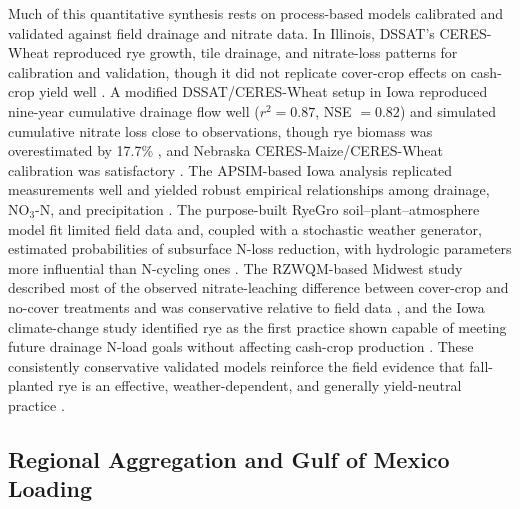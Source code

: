 \documentclass[11pt]{article}
\begin{document}
Much of this quantitative synthesis rests on process-based models calibrated and validated against field drainage and nitrate data. In Illinois, DSSAT's CERES-Wheat reproduced rye growth, tile drainage, and nitrate-loss patterns for calibration and validation, though it did not replicate cover-crop effects on cash-crop yield well \parencite{Gupta2022}. A modified DSSAT/CERES-Wheat setup in Iowa reproduced nine-year cumulative drainage flow well ($r^2=0.87$, NSE $=0.82$) and simulated cumulative nitrate loss close to observations, though rye biomass was overestimated by 17.7\% \parencite{Chatterjee2025}, and Nebraska CERES-Maize/CERES-Wheat calibration was satisfactory \parencite{Birru2023}. The APSIM-based Iowa analysis replicated measurements well and yielded robust empirical relationships among drainage, NO$_3$-N, and precipitation \parencite{MartinezFeria2016}. The purpose-built RyeGro soil--plant--atmosphere model fit limited field data and, coupled with a stochastic weather generator, estimated probabilities of subsurface N-loss reduction, with hydrologic parameters more influential than N-cycling ones \parencite{Feyereisen2006b}. The RZWQM-based Midwest study described most of the observed nitrate-leaching difference between cover-crop and no-cover treatments and was conservative relative to field data \parencite{Malone2014b}, and the Iowa climate-change study identified rye as the first practice shown capable of meeting future drainage N-load goals without affecting cash-crop production \parencite{Malone2020}. These consistently conservative validated models reinforce the field evidence that fall-planted rye is an effective, weather-dependent, and generally yield-neutral practice \parencite{Malone2014b,Malone2018,Chatterjee2025,MartinezFeria2016,Yang2021,Gupta2023b}.

\subsection{Regional Aggregation and Gulf of Mexico Loading}
\end{document}
